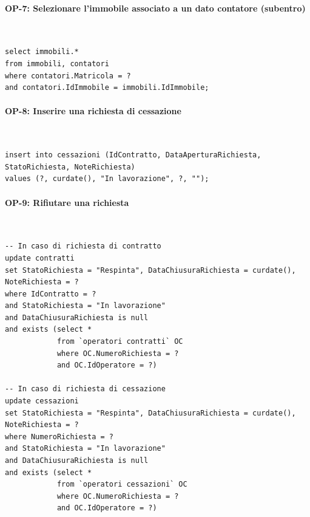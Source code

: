 \documentclass[a4paper,12pt]{report}
\begin{document}
\paragraph{OP-7: Selezionare l'immobile associato a un dato contatore (subentro)}\mbox{}\\
\begin{lstlisting}
select immobili.*
from immobili, contatori
where contatori.Matricola = ?
and contatori.IdImmobile = immobili.IdImmobile;
\end{lstlisting}

\paragraph{OP-8: Inserire una richiesta di cessazione}\mbox{}\\
\begin{lstlisting}
insert into cessazioni (IdContratto, DataAperturaRichiesta, StatoRichiesta, NoteRichiesta)
values (?, curdate(), "In lavorazione", ?, "");
\end{lstlisting}

\paragraph{OP-9: Rifiutare una richiesta}\mbox{}\\
\begin{lstlisting}
-- In caso di richiesta di contratto
update contratti
set StatoRichiesta = "Respinta", DataChiusuraRichiesta = curdate(), NoteRichiesta = ?
where IdContratto = ?
and StatoRichiesta = "In lavorazione"
and DataChiusuraRichiesta is null
and exists (select *
            from `operatori contratti` OC
            where OC.NumeroRichiesta = ?
            and OC.IdOperatore = ?)

-- In caso di richiesta di cessazione
update cessazioni
set StatoRichiesta = "Respinta", DataChiusuraRichiesta = curdate(), NoteRichiesta = ?
where NumeroRichiesta = ?
and StatoRichiesta = "In lavorazione"
and DataChiusuraRichiesta is null
and exists (select *
            from `operatori cessazioni` OC
            where OC.NumeroRichiesta = ?
            and OC.IdOperatore = ?)
\end{lstlisting}
\end{document}
